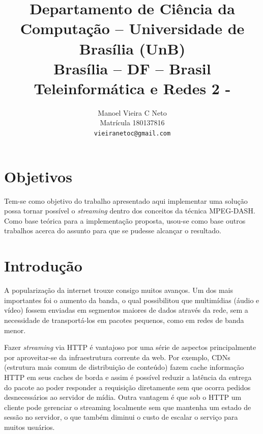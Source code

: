 \documentclass[10pt,twocolumn,letterpaper]{article}
\begin{document}
	
	\title{Departamento de Ciência da Computação -- Universidade de Brasília (UnB)\\
		Brasília -- DF -- Brasil\\
		Teleinformática e Redes 2 - \\
	}
	
	\author{
		Manoel Vieira C Neto\\ 
		Matrícula 180137816\\
		{\tt\small vieiranetoc@gmail.com}
		\and
	}
	\maketitle
	
	\begin{abstract}
		
		
	\end{abstract}
	
	\section{Objetivos}
	Tem-se como objetivo do trabalho apresentado aqui implementar uma solução possa tornar possível o \textit{streaming} dentro dos conceitos da técnica MPEG-DASH. Como base teórica para a implementação proposta, usou-se como base outros trabalhos acerca do assunto para que se pudesse alcançar o resultado\cite{li2014probe}. 
	\section{Introdução}
	A popularização da internet trouxe consigo muitos avanços. Um dos mais importantes foi o aumento da banda, o qual possibilitou que multimídias (áudio e vídeo) fossem enviadas em segmentos maiores de dados através da rede, sem a necessidade de transportá-los em pacotes pequenos, como em redes de banda menor.
	
	Fazer \textit{streaming} via HTTP é vantajoso por uma série de aspectos principalmente por aproveitar-se da infraestrutura corrente da web\cite{niamut2016mpeg}. Por exemplo, CDNs (estrutura mais comum de distribuição de conteúdo) fazem cache informação HTTP em seus caches de borda e assim é possível reduzir a latência da entrega do pacote ao poder responder a requisição diretamente sem que ocorra pedidos desnecessários ao servidor de mídia. Outra vantagem é que sob o HTTP um cliente pode gerenciar o streaming localmente sem que mantenha um estado de sessão no servidor, o que também diminui o custo de escalar o serviço para muitos usuários.
	
\end{document}
